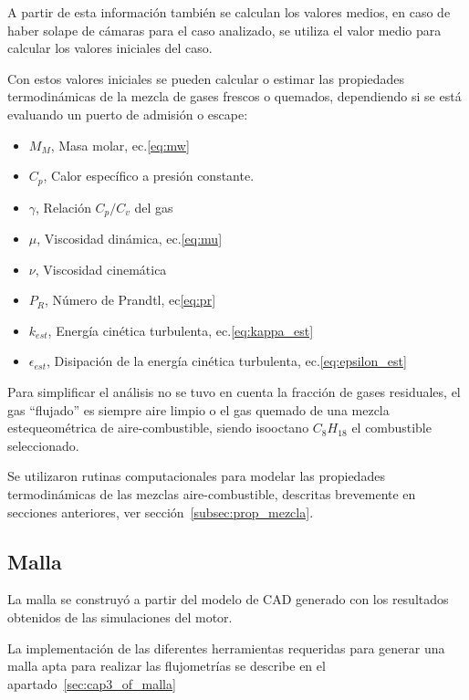 A partir de esta información también se calculan los valores medios, en caso de
haber solape de cámaras para el caso analizado, se utiliza el valor medio para
calcular los valores iniciales del caso.

Con estos valores iniciales se pueden calcular o estimar las propiedades
termodinámicas de la mezcla de gases frescos o quemados, dependiendo si se está
evaluando un puerto de admisión o escape:
%
\begin{itemize}
    \item $M_{M}$, Masa molar, ec.\ref{eq:mw}
    \item $C_{p}$, Calor específico a presión constante.
    \item $\gamma$, Relación $C_{p}/C_{v}$ del gas
    \item $\mu$, Viscosidad dinámica, ec.\ref{eq:mu}
    \item $\nu$, Viscosidad cinemática
    \item $P_{R}$, Número de Prandtl, ec\ref{eq:pr}
    \item $k_{est}$, Energía cinética turbulenta, ec.\ref{eq:kappa_est}
    \item $\epsilon_{est}$, Disipación de la energía cinética turbulenta, ec.\ref{eq:epsilon_est}
\end{itemize}

Para simplificar el análisis no se tuvo en cuenta la fracción de gases
residuales, el gas ``flujado'' es siempre aire limpio o el gas quemado de una
mezcla estequeométrica de aire-combustible, siendo isooctano $C_{8}H_{18}$ el
combustible seleccionado.

Se utilizaron rutinas computacionales para modelar las propiedades
termodinámicas de las mezclas aire-combustible, descritas brevemente en
secciones anteriores, ver sección~\ref{subsec:prop_mezcla}.

\subsection{Malla}

La malla se construyó a partir del modelo de CAD generado con los resultados
obtenidos de las simulaciones del motor.

La implementación de las diferentes herramientas requeridas para generar una
malla apta para realizar las flujometrías se describe en el
apartado~\ref{sec:cap3_of_malla}


